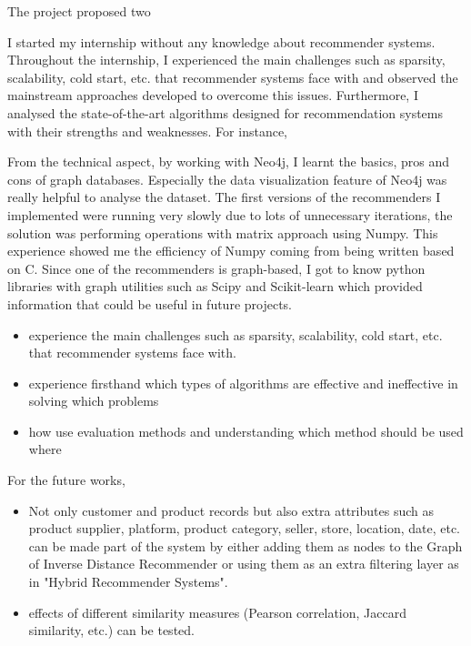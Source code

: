 The project proposed two 

I started my internship without any knowledge about recommender systems. Throughout the internship, I experienced the main challenges such as sparsity, scalability, cold start, etc. that recommender systems face with and observed the mainstream approaches developed to overcome this issues. Furthermore, I analysed the state-of-the-art algorithms designed for recommendation systems with their strengths and weaknesses. For instance, 

From the technical aspect, by working with Neo4j, I learnt the basics, pros and cons of graph databases. Especially the data visualization feature of Neo4j was really helpful to analyse the dataset. The first versions of the recommenders I implemented were running very slowly due to lots of unnecessary iterations, the solution was performing operations with matrix approach using Numpy. This experience showed me the efficiency of Numpy coming from being written based on C. Since one of the recommenders is graph-based, I got to know python libraries with graph utilities such as Scipy and Scikit-learn which provided information that could be useful in future projects.

\begin{itemize}
	\item experience the main challenges such as sparsity, scalability, cold start, etc. that recommender systems face with.
	\item experience firsthand which types of algorithms are effective and ineffective in solving which problems 
	\item how use evaluation methods and understanding which method should be used where
\end{itemize}
For the future works,
\begin{itemize}
	\item Not only customer and product records but also extra attributes such as product supplier, platform, product category, seller, store, location, date, etc. can be made part of the system by either adding them as nodes to the Graph of Inverse Distance Recommender or using them as an extra filtering layer as in "Hybrid Recommender Systems".
	\item effects of different similarity measures (Pearson correlation, Jaccard similarity, etc.) can be tested.
\end{itemize}